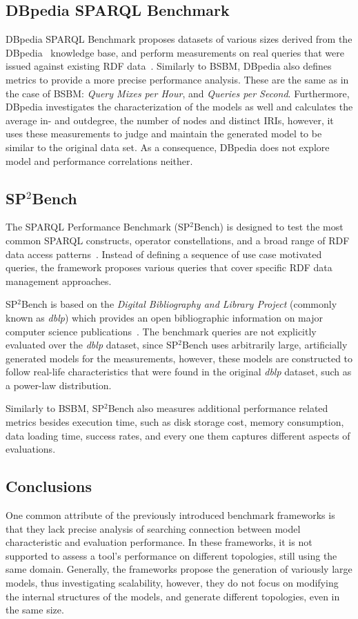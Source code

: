 \subsection{DBpedia SPARQL Benchmark}
DBpedia SPARQL Benchmark proposes datasets of various sizes derived from the DBpedia~\cite{dbpedia_data} knowledge base, and perform measurements on real queries that were issued against existing RDF data~\cite{dbpedia}. Similarly to BSBM, DBpedia also defines metrics to provide a more precise performance analysis. These are the same as in the case of BSBM: \textit{Query Mixes per Hour}, and \textit{Queries per Second}. Furthermore, DBpedia investigates the characterization of the models as well and calculates the average in- and outdegree, the number of nodes and distinct IRIs, however, it uses these measurements to judge and maintain the generated model to be similar to the original data set. As a consequence, DBpedia does not explore model and performance correlations neither.

\subsection{SP$^2$Bench}
The SPARQL Performance Benchmark (SP$^2$Bench) is designed to test the most common SPARQL constructs,
operator constellations, and a broad range of RDF data access patterns~\cite{sp2bench}. Instead of defining a sequence of use case motivated queries, the framework proposes various queries that cover specific RDF data management approaches.

SP$^2$Bench is based on the \textit{Digital Bibliography and Library Project} (commonly known as \textit{dblp}) which provides an open bibliographic information on major computer science publications~\cite{dblp}. The benchmark queries are not explicitly evaluated over the \textit{dblp} dataset, since SP$^2$Bench uses arbitrarily large, artificially generated models for the measurements, however, these models are constructed to follow real-life characteristics that were found in the original \textit{dblp} dataset, such as a power-law distribution.

Similarly to BSBM, SP$^2$Bench also measures additional performance related metrics besides execution time, such as disk storage cost, memory consumption, data loading time, success rates, and every one them captures different aspects of evaluations.


\subsection{Conclusions} \label{sec:benchmark_conclusions}

One common attribute of the previously introduced benchmark frameworks is that they lack precise analysis of searching connection between model characteristic and evaluation performance. In these frameworks, it is not supported to assess a tool's performance on different topologies, still using the same domain. Generally, the frameworks propose the generation of variously large models, thus investigating scalability, however, they do not focus on modifying the internal structures of the models, and generate different topologies, even in the same size.
 
